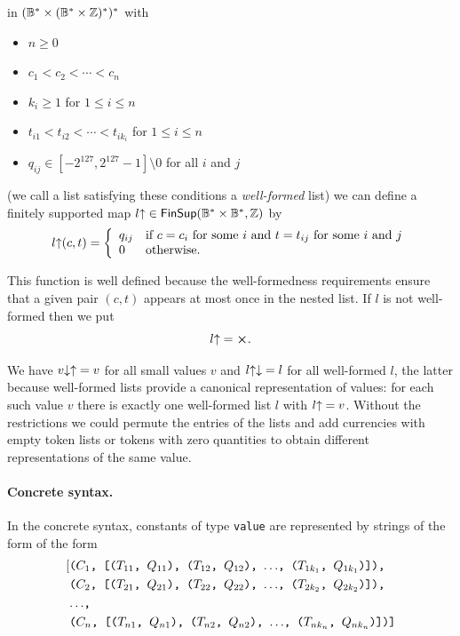 \noindent in $(\mathbb{B}^* \times (\mathbb{B}^* \times \mathbb{Z})^*)^*$ with
\begin{itemize}
 \item $n \geq 0$
 \item $c_1 < c_2 < \cdots <c_n$
 \item $k_i \geq 1$ for $1 \leq i \leq n$
 \item $t_{i1} < t_{i2} < \cdots < t_{ik_i}$ for $1 \leq i \leq n$
 \item $q_{ij} \in [-2^{127}, 2^{127}-1]\setminus 0$ for all $i$ and $j$
\end{itemize}
(we call a list satisfying these conditions a \textit{well-formed} list) we can
define a finitely supported map
$\unflatten{l} \in \mathsf{FinSup}(\B^* \times \B^*, \Z)$ by
$$
  \unflatten{l}(c,t) =
  \left\{\begin{array}{ll}
  q_{ij} & \text{if $c=c_i$ for some $i$ and $t=t_{ij}$ for some $i$ and $j$}\\
  0 &\text{otherwise.}
  \end{array}\right.
$$%

\noindent
This function is well defined because the well-formedness requirements ensure
that a given pair $(c,t)$ appears at most once in the nested list.  If $l$ is
not well-formed then we put
$$
 \unflatten{l} = \errorX.
$$

\noindent
We have $\unflatten{\flatten{v}} = v$ for all small values $v$ and
$\flatten{\unflatten{l}} = l$ for all well-formed $l$, the latter because
well-formed lists provide a canonical representation of values: for each such
value $v$ there is exactly one well-formed list $l$ with $\unflatten{l} = v$.
Without the restrictions we could permute the entries of the lists and add
currencies with empty token lists or tokens with zero quantities to obtain
different representations of the same value.

\paragraph{Concrete syntax.}
In the concrete syntax, constants of type \texttt{value} are represented
by strings of the form of the form
\begin{align*}
 \mathtt{[}
  & \text{\texttt{($C_1$, [($T_{11}$, $Q_{11}$), ($T_{12}$, $Q_{12}$), $\ldots$, ($T_{1k_1}$, $Q_{1k_1}$)]),}}\\
  & \text{\texttt{($C_2$, [($T_{21}$, $Q_{21}$), ($T_{22}$, $Q_{22}$), $\ldots$, ($T_{2k_2}$, $Q_{2k_2}$)]),}}\\
  & \text{\texttt{$\ldots$,}} \\
  & \text{\texttt{($C_n$, [($T_{n1}$, $Q_{n1}$), ($T_{n2}$, $Q_{n2}$), $\ldots$, ($T_{nk_n}$, $Q_{nk_n}$)])]}}
\end{align*}

